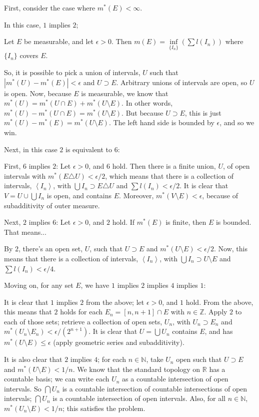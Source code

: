 \documentclass[a4paper,12pt]{article}
\newcommand{\tab}{\hspace{4mm}} %
\newcommand{\absval}[1]{\left\lvert #1 \right\rvert}
\newcommand{\anbrack}[1]{\left\langle #1 \right\rangle}
\newcommand{\ep}{\epsilon}
\newcommand{\N}{\mathbb{N}}
\newcommand{\R}{\mathbb{R}}
\newcommand{\Z}{\mathbb{Z}}
\begin{document}
First, consider the case where $m^*(E) < \infty$.

In this case, $1$ implies $2$;

\tab Let $E$ be measurable, and let $\ep >0$. Then $m(E) = \inf\limits_{\{I_n\}}(\sum l(I_n))$ where $\{I_n\}$ covers $E$.

\tab So, it is possible to pick a union of intervals, $U$ such that $\absval{m^*(U) - m^*(E)} < \ep$ and $U \supset E$. Arbitrary unions of intervals are open, so $U$ is open. Now, because $E$ is measurable, we know that $m^*(U) = m^*(U \cap E) + m^*(U \setminus E)$. In other words, $m^*(U) - m^*(U \cap E) = m^*(U \setminus E)$. But because $U \supset E$, this is just $m^*(U) - m^*(E) = m^*(U \setminus E)$.  The left hand side is bounded by $\ep$, and so we win.

Next, in this case $2$ is equivalent to $6$: %

\tab First, $6$ implies $2$: Let $\ep>0$, and $6$ hold. Then there is a finite union, $U$, of open intervals with $m^*(E \triangle U) < \ep/2$, which means that there is a collection of intervals, $\anbrack{I_n}$, with $\bigcup I_n \supset E \triangle U$ and $\sum l(I_n) < \ep/2$. It is clear that $V = U \cup \bigcup{I_n}$ is open, and contains $E$. Moreover, $m^*(V \setminus E) < \ep$, because of subadditivity of outer measure.

\tab Next, $2$ implies $6$: Let $\ep>0$, and $2$ hold. If $m^*(E)$ is finite, then $E$ is bounded. That means...%

\tab By $2$, there's an open set, $U$, such that $U \supset E$ and $m^*(U \setminus E) < \ep/2$. Now, this means that there is a collection of intervals, $\anbrack{I_n}$, with $\bigcup I_n \supset U \setminus E$ and $\sum l(I_n) < \ep/4$.

Moving on, for any set $E$, we have $1$ implies $2$ implies $4$ implies $1$:

\tab It is clear that $1$ implies $2$ from the above; let $\ep >0$, and $1$ hold. From the above, this means that $2$ holds for each $E_n = [n,n+1] \cap E$ with $n \in \Z$. Apply $2$ to each of those sets; retrieve a collection of open sets, $U_n$, with $U_n \supset E_n$ and $m^*(U_n \setminus E_n) < \ep/(2^{n+1})$. It is clear that $U = \bigcup U_n$ contains $E$, and has $m^*(U \setminus E) \leq \ep$ (apply geometric series and subadditivity).

\tab It is also clear that $2$ implies $4$; for each $n \in \N$, take $U_n$ open such that $U \supset E$ and $m^*(U \setminus E) < 1/n$. We know that the standard topology on $\R$ has a countable basis; we can write each $U_n$ as a countable intersection of open intervals. So $\bigcap U_n$ is a countable intersection of countable intersections of open intervals; $\bigcap U_n$ is a countable intersection of open intervals. Also, for all $n \in \N$, $m^*(U_n \setminus E) < 1/n$; this satisfies the problem.
\end{document}
